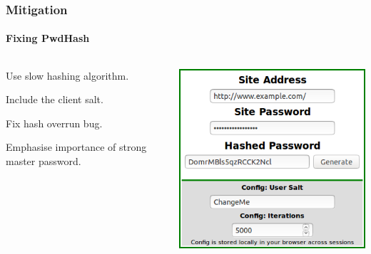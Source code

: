\documentclass[handout, notes=hide]{beamer}
\begin{document}
\begin{frame}
\frametitle{Mitigation}
\framesubtitle{Fixing PwdHash}
\setlength{\parskip}{0.5em}

\begin{columns}[T]
\begin{column}[T]{0.6\textwidth}
\setlength{\parskip}{0.5em}

Use slow hashing algorithm.

Include the client salt.

Fix hash overrun bug.

Emphasise importance of strong master password.

\end{column}
\begin{column}[T]{0.4\textwidth}
\vspace{0.0em}
\includegraphics[width=1.0\textwidth]{pwdhash-poc}
\end{column}
\end{columns}


\end{frame}

\end{document}
